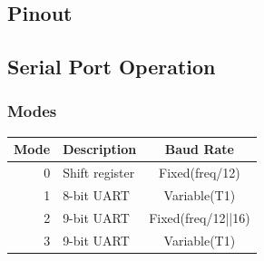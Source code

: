 \documentclass[journal]{IEEEtran}
\begin{document}
{\subsection{Pinout}

\subsection{Serial Port Operation}
\subsubsection{Modes}
\begin{center}
	\begin{tabular}{r|l c}
		Mode & Description & Baud Rate\\
		\hline
		0 & Shift register & Fixed(freq/12) \\
		1 & 8-bit UART & Variable(T1) \\
		2 & 9-bit UART & Fixed(freq/12||16) \\
		3 & 9-bit UART & Variable(T1) \\
	\end{tabular}
\end{center}

}
\end{document}
